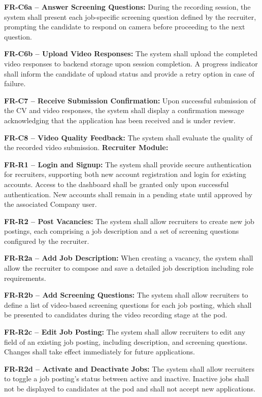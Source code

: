 \begin{outline}
    \3 \textbf{FR-C6a -- Answer Screening Questions:}
    During the recording session, the system shall present each job-specific screening
    question defined by the recruiter, prompting the candidate to respond on camera before
    proceeding to the next question.

    \3 \textbf{FR-C6b -- Upload Video Responses:}
    The system shall upload the completed video responses to backend storage upon session
    completion. A progress indicator shall inform the candidate of upload status and provide
    a retry option in case of failure.

  \2 \textbf{FR-C7 -- Receive Submission Confirmation:}
    Upon successful submission of the CV and video responses, the system shall display a
    confirmation message acknowledging that the application has been received and is under
    review.

  \2 \textbf{FR-C8 -- Video Quality Feedback:}
  The system shall evaluate the quality of the recorded video submission.
  \1 \textbf{Recruiter Module:}

  \2 \textbf{FR-R1 -- Login and Signup:}
  The system shall provide secure authentication for recruiters, supporting both new account
  registration and login for existing accounts. Access to the dashboard shall be granted only
  upon successful authentication. New accounts shall remain in a pending state until approved
  by the associated Company user.

  \2 \textbf{FR-R2 -- Post Vacancies:}
  The system shall allow recruiters to create new job postings, each comprising a job
  description and a set of screening questions configured by the recruiter.

    \3 \textbf{FR-R2a -- Add Job Description:}
    When creating a vacancy, the system shall allow the recruiter to compose and save a
    detailed job description including role requirements.

    \3 \textbf{FR-R2b -- Add Screening Questions:}
    The system shall allow recruiters to define a list of video-based screening questions for
    each job posting, which shall be presented to candidates during the video recording stage
    at the pod.

    \3 \textbf{FR-R2c -- Edit Job Posting:}
    The system shall allow recruiters to edit any field of an existing job posting, including
    description, and screening questions. Changes shall take effect
    immediately for future applications.

    \3 \textbf{FR-R2d -- Activate and Deactivate Jobs:}
    The system shall allow recruiters to toggle a job posting's status between active and
    inactive. Inactive jobs shall not be displayed to candidates at the pod and shall not
    accept new applications.


\end{outline}
